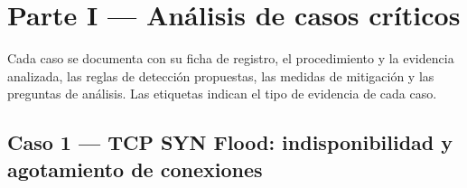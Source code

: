 \chapter[Parte I --- Casos cr\'iticos]{Parte I --- An\'alisis de casos cr\'iticos}

\label{ch:parte1}

Cada caso se documenta con su ficha de registro, el procedimiento y la evidencia analizada, las reglas de detecci\'on propuestas, las medidas de mitigaci\'on y las preguntas de an\'alisis. Las etiquetas indican el tipo de evidencia de cada caso.


\section{Caso 1 --- TCP SYN Flood: indisponibilidad y agotamiento de conexiones}

 

